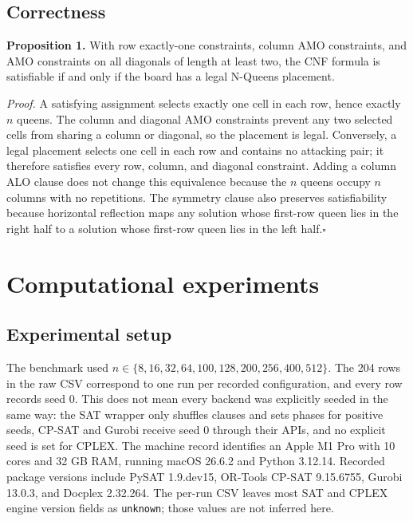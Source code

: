 \documentclass[a4paper,fleqn]{cas-sc}
\begin{document}
\subsection{Correctness}
\textbf{Proposition 1.} With row exactly-one constraints, column AMO constraints, and AMO constraints on all diagonals of length at least two, the CNF formula is satisfiable if and only if the board has a legal N-Queens placement.

\textit{Proof.} A satisfying assignment selects exactly one cell in each row, hence exactly $n$ queens. The column and diagonal AMO constraints prevent any two selected cells from sharing a column or diagonal, so the placement is legal. Conversely, a legal placement selects one cell in each row and contains no attacking pair; it therefore satisfies every row, column, and diagonal constraint. Adding a column ALO clause does not change this equivalence because the $n$ queens occupy $n$ columns with no repetitions. The symmetry clause also preserves satisfiability because horizontal reflection maps any solution whose first-row queen lies in the right half to a solution whose first-row queen lies in the left half.\hfill$\square$

\section{Computational experiments}
\subsection{Experimental setup}
The benchmark used $n\in\{8,16,32,64,100,128,200,256,400,512\}$. The 204 rows in the raw CSV correspond to one run per recorded configuration, and every row records seed 0. This does not mean every backend was explicitly seeded in the same way: the SAT wrapper only shuffles clauses and sets phases for positive seeds, CP-SAT and Gurobi receive seed 0 through their APIs, and no explicit seed is set for CPLEX. The machine record identifies an Apple M1 Pro with 10 cores and 32 GB RAM, running macOS 26.6.2 and Python 3.12.14. Recorded package versions include PySAT 1.9.dev15, OR-Tools CP-SAT 9.15.6755, Gurobi 13.0.3, and Docplex 2.32.264. The per-run CSV leaves most SAT and CPLEX engine version fields as \texttt{unknown}; those values are not inferred here.
\end{document}
